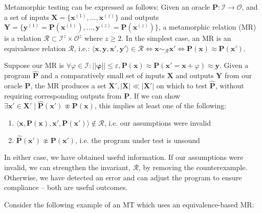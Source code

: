 Metamorphic testing can be expressed as follows: Given an oracle $\mathbf P: \mathcal I \rightarrow \mathcal O$, and a set of inputs $\mathbf X = \{\mathbf{x}^{(1)}, \dots, \mathbf{x}^{(z)}\}$ and outputs $\mathbf Y = \{\mathbf{y}^{(1)} = \mathbf{P}(\mathbf{x}^{(1)}), \dots, \mathbf{y}^{(z)} = \mathbf{P}(\mathbf{x}^{(z)})\}$, a metamorphic relation (MR) is a relation $\mathcal R \subset \mathcal I^z \times \mathcal O^z$ where $z \geq 2$. In the simplest case, an MR is an equivalence relation $\mathcal R$, i.e.: $\langle \mathbf x, \mathbf y, \mathbf x', \mathbf y' \rangle \in \mathcal R \Leftrightarrow \mathbf x \sim_{\mathcal R} \mathbf x' \Leftrightarrow \mathbf P(\mathbf x) \approx \mathbf P(\mathbf x')$.

Suppose our MR is $\forall \varphi \in \mathcal I: ||\mathbf\varphi|| \leq \varepsilon, \mathbf P(\mathbf x) \approx \mathbf P(\mathbf x' = \mathbf x + \varphi) \approx \mathbf y$. Given a program $\mathbf{\hat P}$ and a comparatively small set of inputs $\mathbf X$ and outputs $\mathbf Y$ from our oracle $\mathbf P$, the MR produces a set $\mathbf X', |\mathbf X| \ll |\mathbf X'|$ on which to test $\mathbf{\hat P}$, without requiring corresponding outputs from $\mathbf P$. If we can show $\exists \mathbf x' \in \mathbf X' \mid \mathbf{\hat P}(\mathbf x') \not\approx \mathbf P(\mathbf x)$, this implies at least one of the following:

\begin{enumerate}
\item $\langle \mathbf x, \mathbf P(\mathbf x), \mathbf x', \mathbf P(\mathbf x')\rangle \notin \mathcal R$, i.e. our assumptions were invalid
\item $\mathbf{\hat P}(\mathbf x') \not\approx \mathbf{P}(\mathbf x')$, i.e. the program under test is unsound
\end{enumerate}
%
In either case, we have obtained useful information. If our assumptions were invalid, we can strengthen the invariant, $\mathcal R$, by removing the counterexample. Otherwise, we have detected an error and can adjust the program to ensure compliance -- both are useful outcomes.

Consider the following example of an MT which uses an equivalence-based MR:

